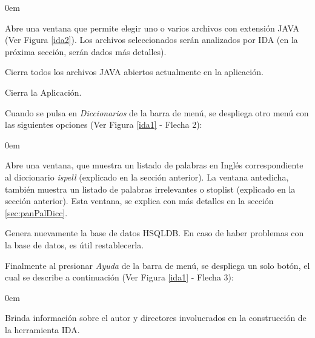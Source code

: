 \begin{description}
\itemsep0em%
\item[Abrir archivo(s) JAVA:] Abre una ventana que permite elegir uno o varios archivos con extensión JAVA (Ver Figura \ref{ida2}). Los archivos seleccionados serán analizados por IDA (en la próxima sección, serán dados más detalles).
\item[Cerrar Todo:] Cierra todos los archivos JAVA abiertos actualmente en la aplicación.
\item[Salir:] Cierra la Aplicación.
\end{description}

Cuando se pulsa en \textit{Diccionarios} de la barra de menú, se despliega otro menú con las siguientes opciones (Ver Figura \ref{ida1} - Flecha 2):

\begin{description}
\itemsep0em%

\item[Ver Diccionarios:] Abre una ventana, que muestra un listado de palabras en Inglés correspondiente al diccionario \textit{ispell} (explicado en la sección anterior). %
La ventana antedicha, también muestra un listado de palabras irrelevantes o stoplist (explicado en la sección anterior). Esta ventana, se explica con más detalles en la sección \ref{sec:panPalDicc}.

\item[Restablecer B.D.(Base de Datos):] Genera nuevamente la base de datos HSQLDB. En caso de haber problemas con la base de datos, es útil restablecerla.

\end{description}

Finalmente al presionar \textit{Ayuda} de la barra de menú, se despliega un solo botón, el cual se describe a continuación (Ver Figura \ref{ida1} - Flecha 3):

\begin{description}
\itemsep0em%
\item[Acerca de:] Brinda información sobre el autor y directores involucrados en la construcción de la herramienta IDA.
\end{description}

